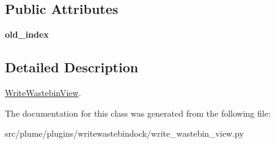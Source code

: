\subsection*{Public Attributes}
\begin{DoxyCompactItemize}
\item 
{\bfseries old\+\_\+index}\hypertarget{classplume-creator_1_1src_1_1plume_1_1plugins_1_1writewastebindock_1_1write__wastebin__view_1_1_write_wastebin_view_ac996faef7650844fa48d6b4a23d85dfb}{}\label{classplume-creator_1_1src_1_1plume_1_1plugins_1_1writewastebindock_1_1write__wastebin__view_1_1_write_wastebin_view_ac996faef7650844fa48d6b4a23d85dfb}

\end{DoxyCompactItemize}


\subsection{Detailed Description}
\hyperlink{classplume-creator_1_1src_1_1plume_1_1plugins_1_1writewastebindock_1_1write__wastebin__view_1_1_write_wastebin_view}{Write\+Wastebin\+View}. 

The documentation for this class was generated from the following file\+:\begin{DoxyCompactItemize}
\item 
src/plume/plugins/writewastebindock/write\+\_\+wastebin\+\_\+view.\+py\end{DoxyCompactItemize}
